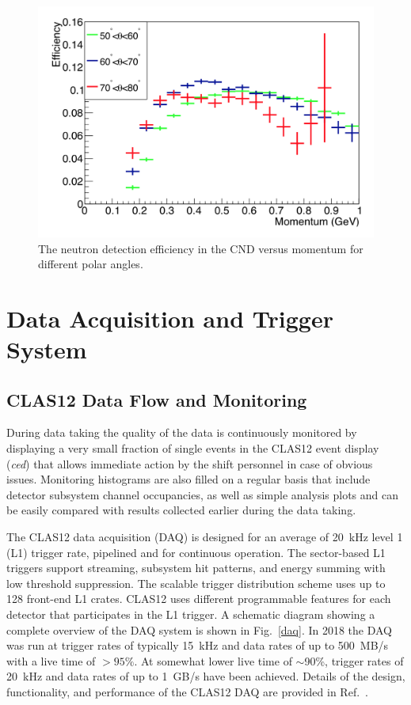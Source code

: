 \documentclass[final,3p,twocolumn]{elsarticle}
\begin{document}
\begin{figure}[htbp!]
\centerline{\includegraphics[width=0.9\columnwidth]{cnd-neutron-efficiency.png}}
\caption{The neutron detection efficiency in the CND versus momentum for different polar angles.}
\label{CND-neutron-efficiency}
\end{figure} 

\section{Data Acquisition and Trigger System} 

\subsection {CLAS12 Data Flow and Monitoring} 

During data taking the quality of the data is continuously monitored by displaying a very small fraction of single
events in the CLAS12 event display ({\it ced}) that allows immediate action by the shift personnel in case of obvious
issues. Monitoring histograms are also filled on a regular basis that include detector subsystem channel occupancies,
as well as simple analysis plots and can be easily compared with results collected earlier during the data taking.  

The CLAS12 data acquisition (DAQ) is designed for an average of 20~kHz level 1 (L1) trigger rate, pipelined and
for continuous operation. The sector-based  L1 triggers support streaming, subsystem hit patterns, and energy
summing with low threshold suppression.  The scalable trigger distribution scheme uses up to 128 front-end L1
crates. CLAS12 uses different programmable features for each detector that participates in the L1 trigger. A
schematic diagram showing a complete overview of the DAQ system is shown in Fig.~\ref{daq}. In 2018 the DAQ
was run at trigger rates of typically 15~kHz and data rates of up to 500~MB/s with a live time of $> 95\%$. At
somewhat lower live time of $\sim$90\%, trigger rates of 20~kHz and data rates of up to 1~GB/s have been
achieved. Details of the design, functionality, and performance of the CLAS12 DAQ are provided in  Ref.~\cite{DAQ}. 
 
\end{document}
